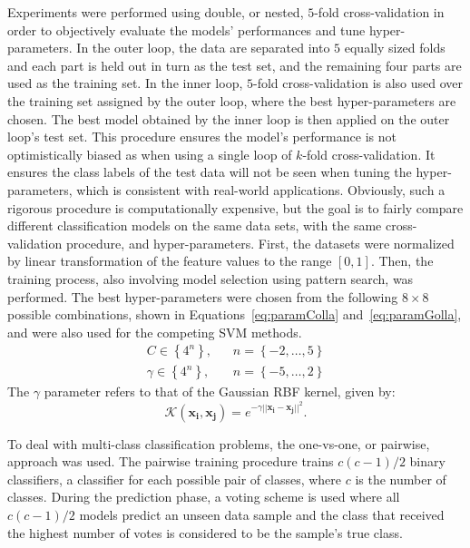 \documentclass[reqno]{vcuthesis}
\newcommand{\set}[1]{{\left\{#1\right\}}}
\newcommand{\norm}[1]{{||#1||}}
\numberwithin{equation}{chapter}
\begin{document}
Experiments were performed using double, or nested, $5$-fold cross-validation in order to objectively evaluate the models' performances and tune hyper-parameters. In the outer loop, the data are separated into $5$ equally sized folds and each part is held out in turn as the test set, and the remaining four parts are used as the training set. In the inner loop, $5$-fold cross-validation is also used over the training set assigned by the outer loop, where the best hyper-parameters are chosen. The best model obtained by the inner loop is then applied on the outer loop's test set. This procedure ensures the model's performance is not optimistically biased as when using a single loop of $k$-fold cross-validation. It ensures the class labels of the test data will not be seen when tuning the hyper-parameters, which is consistent with real-world applications. Obviously, such a rigorous procedure is computationally expensive, but the goal is to fairly compare different classification models on the same data sets, with the same cross-validation procedure, and hyper-parameters. First, the datasets were normalized by linear transformation of the feature values to the range $[0,1]$. Then, the training process, also involving model selection using pattern search, was performed. The best hyper-parameters were chosen from the following $8 \times 8$ possible combinations, shown in Equations~\eqref{eq:paramColla} and~\eqref{eq:paramGolla}, and were also used for the competing SVM methods.
\begin{subequations}
\label{eq:hyperparamolla}
\begin{align}
C \in \set{4^n}, & \,\,\,\,\,n = \set{-2, \ldots, 5} \label{eq:paramColla}\\
\gamma \in \set{4^n},  & \,\,\,\,\,n = \set{-5, \ldots, 2} \label{eq:paramGolla}
\end{align}
\end{subequations}
The $\gamma$ parameter refers to that of the Gaussian RBF kernel, given by:
\begin{equation}
\label{eq:rbf}
\mathcal{K}(\bm{x_i},\bm{x_j}) = e^{-\gamma\norm{\bm{x_i} - \bm{x_j}}^2}.
\end{equation}

To deal with multi-class classification problems, the one-vs-one, or pairwise, approach was used. The pairwise training procedure trains $c(c - 1)/2$ binary classifiers, a classifier for each possible pair of classes, where $c$ is the number of classes. During the prediction phase, a voting scheme is used where all $c(c - 1)/2$ models predict an unseen data sample and the class that received the highest number of votes is considered to be the sample’s true class.
\end{document}
